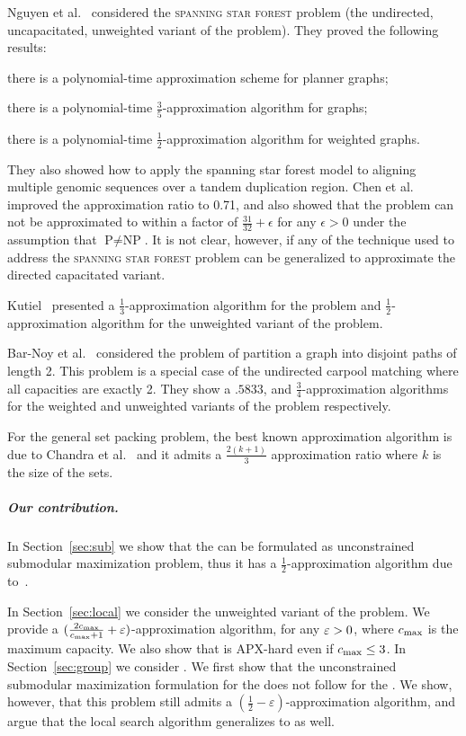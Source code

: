 Nguyen et al.~\cite{nguyen2008approximating} considered
the \textsc{spanning star forest} problem (the undirected,
uncapacitated, unweighted variant of the problem).  They proved the
following results:
\begin{inparaenum}[(i)]
\item there is a polynomial-time approximation scheme for planner graphs;
\item there is a polynomial-time $\frac{3}{5}$-approximation algorithm for graphs;
\item there is a polynomial-time $\frac{1}{2}$-approximation algorithm for weighted graphs.
\end{inparaenum}
They also showed how to apply the spanning star forest model to
aligning multiple genomic sequences over a tandem duplication region.
Chen et al.~\cite{chen2007improved} improved the approximation ratio
to 0.71, and also showed that the problem can not be approximated to
within a factor of $\frac{31}{32} + \epsilon$ for any $\epsilon > 0$
under the assumption that $\text{P} \neq \text{NP}$.  It is not clear,
however, if any of the technique used to address the
\textsc{spanning star forest} problem can be generalized to approximate the
directed capacitated variant.

Kutiel~\cite{kutiel2016} presented a $\frac{1}{3}$-approximation
algorithm for the problem and $\frac{1}{2}$-approximation algorithm for the
unweighted variant of the problem.

Bar-Noy et al.~\cite{bar2015improved} considered the problem of partition a
graph into disjoint paths of length 2.
This problem is a special case of the undirected carpool matching
where all capacities are exactly 2.
They show a $.5833$, and $\frac{3}{4}$-approximation algorithms for the weighted
and unweighted variants of the problem respectively.

For the general set packing problem, the best known approximation algorithm is
due to Chandra et al.~\cite{chandra2001greedy} and it admits a 
$\frac{2(k +1)}{3}$ approximation ratio where $k$ is the size of the sets.


\subparagraph{Our contribution.}
%
In Section~\ref{sec:sub} we show that the \carpool can be formulated as
unconstrained submodular maximization problem, thus it has a
$\frac{1}{2}$-approximation algorithm due to~\cite{BFNS15}.  

In Section~\ref{sec:local} we consider the unweighted variant of the
problem.  We provide a $(\frac{2c_{\max}}{c_{\max}+1} + \varepsilon)$-approximation
algorithm, for any $\varepsilon>0$, where $c_{\max}$ is the maximum capacity.
We also show that \carpool is APX-hard even if $c_{\max} \leq 3$.
%
In Section~\ref{sec:group} we consider \gcp.  
We first show that the unconstrained submodular maximization formulation for
the \carpool does not follow for the \gcp.
We show, however, that this problem still admits
a $(\frac{1}{2} -\varepsilon)$-approximation algorithm, and argue that the local
search algorithm generalizes to \gcp as well.
